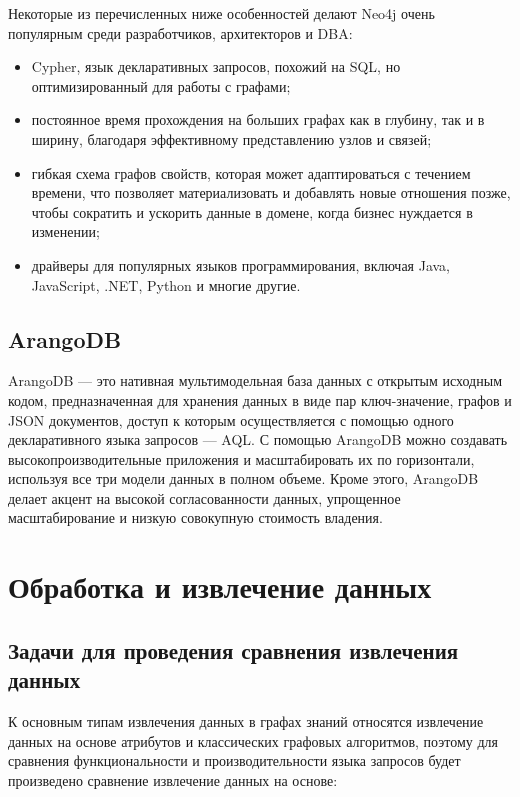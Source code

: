 Некоторые из перечисленных ниже особенностей делают Neo4j очень популярным среди разработчиков, архитекторов и DBA:

\begin{itemize}
    \item Cypher, язык декларативных запросов, похожий на SQL, но оптимизированный для работы с графами;
    \item постоянное время прохождения на больших графах как в глубину, так и в ширину, благодаря эффективному представлению узлов и связей;
    \item гибкая схема графов свойств, которая может адаптироваться с течением времени, что позволяет материализовать и добавлять новые отношения позже, чтобы сократить и ускорить данные в домене, когда бизнес нуждается в изменении;
    \item драйверы для популярных языков программирования, включая Java, JavaScript, .NET, Python и многие другие.
\end{itemize}

\subsection{ArangoDB}

ArangoDB — это нативная мультимодельная база данных с открытым исходным кодом, предназначенная для хранения данных в виде пар ключ-значение, графов и JSON документов, доступ к которым осуществляется с помощью одного декларативного языка запросов — AQL. С помощью ArangoDB можно создавать высокопроизводительные приложения и масштабировать их по горизонтали, используя все три модели данных в полном объеме. Кроме этого, ArangoDB делает акцент на высокой согласованности данных, упрощенное масштабирование и низкую совокупную стоимость владения.


\section{Обработка и извлечение данных}

\subsection{Задачи для проведения сравнения извлечения данных}

К основным типам извлечения данных в графах знаний относятся извлечение данных на основе атрибутов и классических графовых алгоритмов, поэтому для сравнения функциональности и производительности языка запросов будет произведено сравнение извлечение данных на основе:

